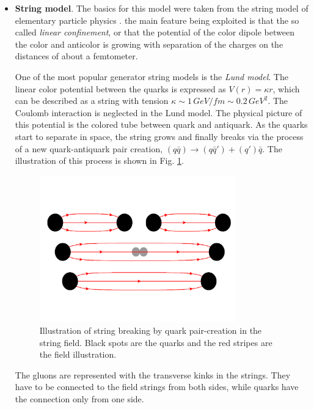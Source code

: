 \begin{itemize}
 \item \textbf{String model}. The basics for this model were taken from the string model of elementary particle physics \cite{Artru:1974hr}.
 the main feature being exploited is that the so called \textit{linear confinement}, or that the potential of the color dipole 
 between the color and anticolor is growing with separation of the charges on the distances of about a femtometer.
 
 One of the most popular generator string models is the \textit{Lund model}. The linear color potential between the quarks is 
 expressed as $V(r) = \kappa r$, which can be described as a string with tension $\kappa \sim 1\,GeV/fm \sim 0.2\,GeV^{2}$. 
 The Coulomb interaction is neglected in the Lund model. The physical picture of this potential is the colored tube between quark
 and antiquark. As the quarks start to separate in space, the string grows and finally breaks via the process of a new quark-antiquark
 pair creation, $(q\bar{q}) \rightarrow (q\bar{q}') + (q')\bar{q}$. The illustration of this process is shown in Fig. \ref{fig:Lund}.
 
 \begin{figure}[h]
  \centering
  \includegraphics[width=0.8\textwidth]{03_simulation/plots/Lund_hadr.pdf}
  \caption{Illustration of string breaking by quark pair-creation in the string field. Black spots are the quarks and the red
  stripes are the field illustration.}
  \label{fig:Lund}
 \end{figure}
 
 The gluons are represented with the transverse kinks in the strings. They have to be connected to the field strings from both
 sides, while quarks have the connection only from one side.
 

\end{itemize}
